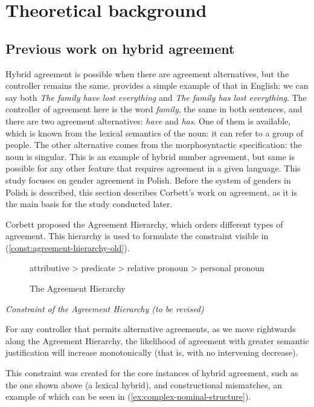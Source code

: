 \chapter{Theoretical background}
\startcontents[chapters]

\section{Previous work on hybrid agreement}
Hybrid agreement is possible when there are agreement alternatives, but the controller remains the same. \cite{corbett_agreement_2023} provides a simple example of that in English: we can say both \textsl{The family have lost everything} and \textsl{The family has lost everything}. The controller of agreement here is the word \textsl{family}, the same in both sentences, and there are two agreement alternatives: \textsl{have} and \textsl{has}. One of them is available, which is known from the lexical semantics of the noun: it can refer to a group of people. The other alternative comes from the morphosyntactic specification: the noun is singular. This is an example of hybrid number agreement, but same is possible for any other feature that requires agreement in a given language. This study focuses on gender agreement in Polish. Before the system of genders in Polish is described, this section describes Corbett's work on agreement, as it is the main basis for the study conducted later.

Corbett proposed the Agreement Hierarchy, which orders different types of agreement. This hierarchy is used to formulate the constraint visible in (\ref{const:agreement-hierarchy-old}).

\begin{figure}[H]
  \centering
  attributive > predicate > relative pronoun > personal pronoun
  \caption{The Agreement Hierarchy \citep{corbett_agreement_1979}}
  \label{fig:agreement-hierarchy}
\end{figure}

\begin{exe}
  \ex\label{const:agreement-hierarchy-old}
  \textit{Constraint of the Agreement Hierarchy (to be revised)}
  
  For any controller that permits alternative agreements, as we move rightwards along the Agreement Hierarchy, the likelihood of agreement with greater semantic justification will increase monotonically (that is, with no intervening decrease).
\end{exe}

This constraint was created for the core instances of hybrid agreement, such as the one shown above (a lexical hybrid), and constructional mismatches, an example of which can be seen in (\ref{ex:complex-nominal-structure}).

